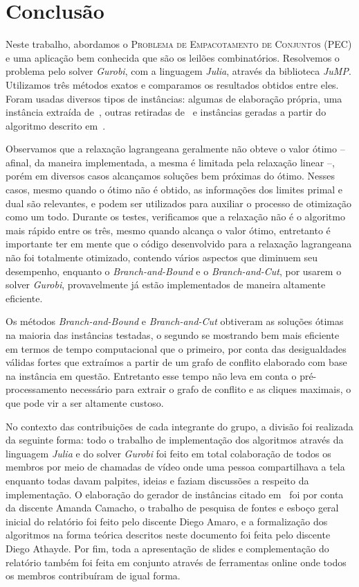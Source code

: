 \documentclass{article}
\begin{document}
    
	\section{Conclusão}\label{sec:concl}
	Neste trabalho, abordamos o \textsc{Problema de Empacotamento de Conjuntos} (PEC) e uma aplicação bem conhecida que são os leilões combinatórios. Resolvemos o problema pelo solver \emph{Gurobi}, com a linguagem \emph{Julia}, através da biblioteca \emph{JuMP}. Utilizamos três métodos exatos e comparamos os resultados obtidos entre eles. Foram usadas diversos tipos de instâncias: algumas de elaboração própria, uma instância extraída de~\cite{Elisa}, outras retiradas de~\cite{benchmarks} e instâncias geradas a partir do algoritmo descrito em~\cite{guo2005using}. 
	
	Observamos que a relaxação lagrangeana geralmente não obteve o valor ótimo -- afinal, da maneira implementada, a mesma é limitada pela relaxação linear --, porém em diversos casos alcançamos soluções bem próximas do ótimo. Nesses casos, mesmo quando o ótimo não é obtido, as informações dos limites primal e dual são relevantes, e podem ser utilizados para auxiliar o processo de otimização como um todo. Durante os testes, verificamos que a relaxação não é o algoritmo mais rápido entre os três, mesmo quando alcança o valor ótimo, entretanto é importante ter em mente que o código desenvolvido para a relaxação lagrangeana não foi totalmente otimizado, contendo vários aspectos que diminuem seu desempenho, enquanto o \emph{Branch-and-Bound} e o \emph{Branch-and-Cut}, por usarem o solver \emph{Gurobi}, provavelmente já estão implementados de maneira altamente eficiente.
	
	Os métodos \emph{Branch-and-Bound} e \emph{Branch-and-Cut} obtiveram as soluções ótimas na maioria das instâncias testadas, o segundo se mostrando bem mais eficiente em termos de tempo computacional que o primeiro, por conta das desigualdades válidas fortes que extraímos a partir de um grafo de conflito elaborado com base na instância em questão. Entretanto esse tempo não leva em conta o pré-processamento necessário para extrair o grafo de conflito e as cliques maximais, o que pode vir a ser altamente custoso.
	
	No contexto das contribuições de cada integrante do grupo, a divisão foi realizada da seguinte forma: todo o trabalho de implementação dos algoritmos através da linguagem \emph{Julia} e do solver \emph{Gurobi} foi feito em total colaboração de todos os membros por meio de chamadas de vídeo onde uma pessoa compartilhava a tela enquanto todas davam palpites, ideias e faziam discussões a respeito da implementação. O elaboração do gerador de instâncias citado em~\cite{guo2005using} foi por conta da discente Amanda Camacho, o trabalho de pesquisa de fontes e esboço geral inicial do relatório foi feito pelo discente Diego Amaro, e a formalização dos algoritmos na forma teórica descritos neste documento foi feita pelo discente Diego Athayde. Por fim, toda a apresentação de slides e complementação do relatório também foi feita em conjunto através de ferramentas online onde todos os membros contribuíram de igual forma.
	
\end{document}
